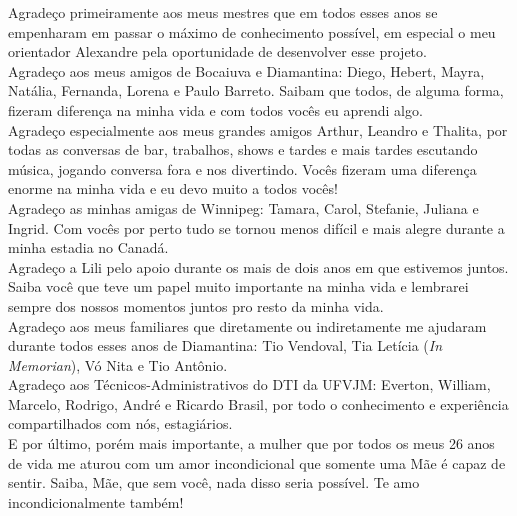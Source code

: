 \begin{agradecimentos}
Agradeço primeiramente aos meus mestres que em todos esses anos se empenharam 
em passar o máximo de conhecimento possível, em especial o meu orientador 
Alexandre pela oportunidade de desenvolver esse projeto.\\
Agradeço aos meus amigos de Bocaiuva e Diamantina: Diego, Hebert, Mayra, Natália, Fernanda, Lorena e Paulo Barreto. Saibam que todos, de alguma forma, fizeram diferença na minha vida e com todos vocês eu aprendi algo.\\
Agradeço especialmente aos meus grandes amigos Arthur, Leandro e Thalita, por 
todas as conversas de bar, trabalhos, shows e tardes e mais tardes escutando 
música, jogando conversa fora e nos divertindo. Vocês fizeram uma diferença 
enorme na minha vida e eu devo muito a todos vocês!\\
Agradeço as minhas amigas de Winnipeg: Tamara, Carol, Stefanie, Juliana e Ingrid. Com vocês por perto tudo se tornou menos difícil e mais alegre durante a minha estadia no Canadá.\\
Agradeço a Lili pelo apoio durante os mais de dois anos em que estivemos juntos. Saiba você que teve um papel muito importante na minha vida e lembrarei sempre dos nossos momentos juntos pro resto da minha vida.\\
Agradeço aos meus familiares que diretamente ou indiretamente me ajudaram durante todos esses anos de Diamantina: Tio Vendoval, Tia Letícia (\textit{In Memorian}), Vó Nita e Tio Antônio.\\
Agradeço aos Técnicos-Administrativos do DTI da UFVJM: Everton, William, Marcelo, Rodrigo, André e Ricardo Brasil, por todo o conhecimento e experiência compartilhados com nós, estagiários.\\
E por último, porém mais importante, a mulher que por todos os meus 26 anos de vida me aturou com um amor incondicional que somente uma Mãe é capaz de sentir. Saiba, Mãe, que sem você, nada disso seria possível. Te amo incondicionalmente também!\\
\end{agradecimentos}